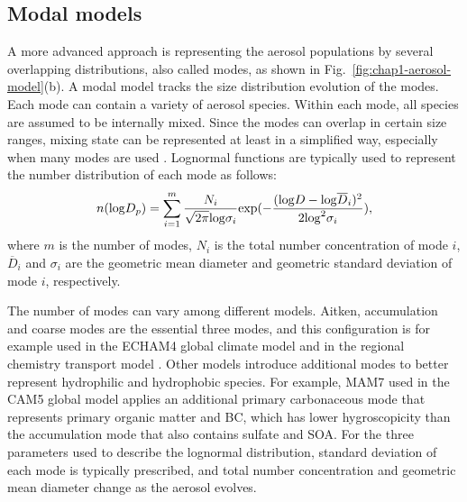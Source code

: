 \documentclass[edeposit,fullpage]{uiucthesis2009}
\begin{document}
\subsection{Modal models}
A more advanced approach is representing the aerosol populations by
several overlapping distributions, also called modes, as shown in
Fig.~\ref{fig:chap1-aerosol-model}(b). A modal model tracks the size
distribution evolution of the modes. Each mode can contain a variety
of aerosol species. Within each mode, all species are assumed to be
internally mixed. Since the modes can overlap in certain size ranges,
mixing state can be represented at least in a simplified way,
especially when many modes are used \citep{Bauer2008}. Lognormal functions are
typically used to represent the number distribution of each mode as
follows:
\begin{equation}
\centering
    n({\rm log}D_p) = \sum_{i=1}^{m}\frac{N_i}{\sqrt{2\pi}{\rm log}\sigma_i}{\rm exp}(-\frac{({\rm log}D-{\rm log}{\overline{D}_i})^2}{2{\rm log}^2\sigma_i}),
\end{equation}
where $m$ is the number of modes, $N_i$ is the total number
concentration of mode $i$, $\overline{D}_{i}$ and $\sigma_i$ are the
geometric mean diameter and geometric standard deviation of mode $i$,
respectively.

The number of modes can vary among different models. Aitken,
accumulation and coarse modes are the essential three modes, and this
configuration is for example used in the ECHAM4 global climate model
\citep{lauer2005simulating} and in the regional chemistry 
transport model \citep{binkowski2003models}. 
Other models introduce additional modes to better
represent hydrophilic and hydrophobic species. For example, MAM7 used
in the CAM5 global model applies an additional primary carbonaceous
mode that represents primary organic matter and BC, which has lower
hygroscopicity than the accumulation mode \citep{liu2012toward} that
also contains sulfate and SOA. For the three parameters used to
describe the lognormal distribution, standard deviation of each mode
is typically prescribed, and total number concentration and geometric
mean diameter change as the aerosol evolves.
\end{document}
